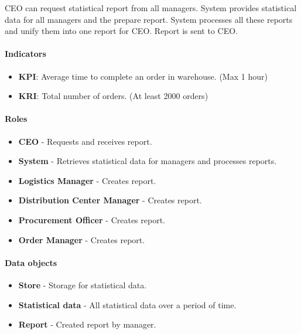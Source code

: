 \documentclass[11pt,a4paper]{article}
\begin{document}
CEO can request statistical report from all managers. System provides statistical data for all managers and the prepare report. System processes all these reports and unify them into one report for CEO. Report is sent to CEO.

\paragraph{Indicators}

\begin{itemize}
    \item \textbf{KPI}: Average time to complete an order in warehouse. (Max 1 hour)
    \item \textbf{KRI}: Total number of orders. (At least 2000 orders)
\end{itemize}

\paragraph{Roles}

\begin{itemize}
    \item \textbf{CEO} - Requests and receives report.
    \item \textbf{System} - Retrieves statistical data for managers and processes reports.
    \item \textbf{Logistics Manager} - Creates report.
    \item \textbf{Distribution Center Manager} - Creates report.
    \item \textbf{Procurement Officer} - Creates report.
    \item \textbf{Order Manager} - Creates report.
\end{itemize}

\paragraph{Data objects}

\begin{itemize}
    \item \textbf{Store} - Storage for statistical data.
    \item \textbf{Statistical data} - All statistical data over a period of time.
    \item \textbf{Report} - Created report by manager.
\end{itemize}

\newpage
\end{document}
